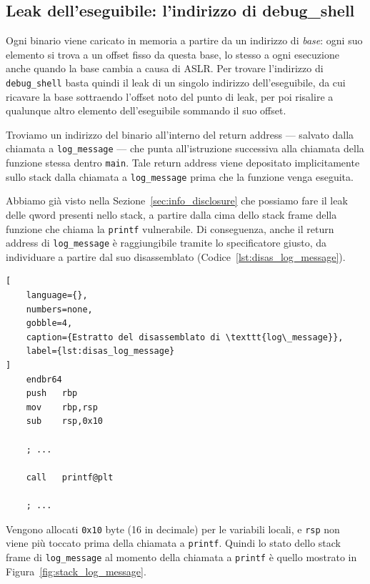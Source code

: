 \subsection{Leak dell'eseguibile: l'indirizzo di debug\_shell}\label{subsec:bin_leak}
Ogni binario viene caricato in memoria a partire da un indirizzo di \emph{base}: ogni suo elemento si trova a un offset fisso da questa base, lo stesso a ogni esecuzione anche quando la base cambia a causa di ASLR. Per trovare l'indirizzo di \texttt{debug\_shell} basta quindi il leak di un singolo indirizzo dell'eseguibile, da cui ricavare la base sottraendo l'offset noto del punto di leak, per poi risalire a qualunque altro elemento dell'eseguibile sommando il suo offset.

Troviamo un indirizzo del binario all'interno del return address --- salvato dalla chiamata a \texttt{log\_message} --- che punta all'istruzione successiva alla chiamata della funzione stessa dentro \texttt{main}. Tale return address viene depositato implicitamente sullo stack dalla chiamata a \texttt{log\_message} prima che la funzione venga eseguita.

Abbiamo già visto nella Sezione~\ref{sec:info_disclosure} che possiamo fare il leak delle qword presenti nello stack, a partire dalla cima dello stack frame della funzione che chiama la \texttt{printf} vulnerabile. Di conseguenza, anche il return address di \texttt{log\_message} è raggiungibile tramite lo specificatore giusto, da individuare a partire dal suo disassemblato (Codice~\ref{lst:disas_log_message}).
\begin{lstlisting}[
    language={},
    numbers=none,
    gobble=4,
    caption={Estratto del disassemblato di \texttt{log\_message}},
    label={lst:disas_log_message}
]
    endbr64
    push   rbp
    mov    rbp,rsp
    sub    rsp,0x10
    
    ; ...

    call   printf@plt

    ; ...
\end{lstlisting}
Vengono allocati \texttt{0x10} byte (16 in decimale) per le variabili locali, e \texttt{rsp} non viene più toccato prima della chiamata a \texttt{printf}. Quindi lo stato dello stack frame di \texttt{log\_message} al momento della chiamata a \texttt{printf} è quello mostrato in Figura~\ref{fig:stack_log_message}.

